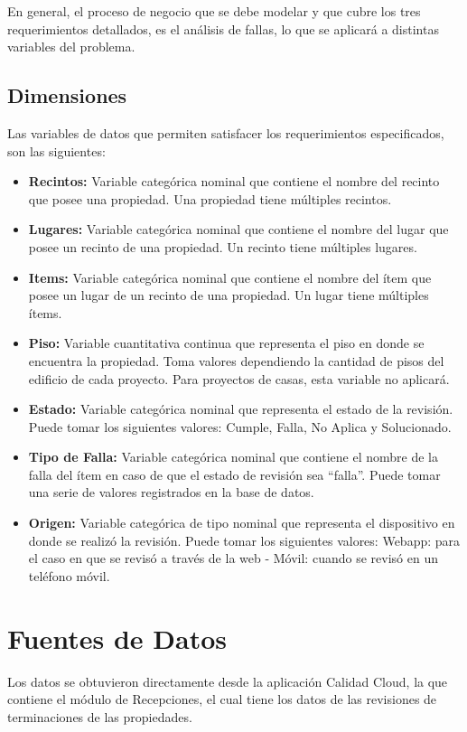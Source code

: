 \documentclass[letter,12pt,oneside]{report}
\begin{document}
En general, el proceso de negocio que se debe modelar y que cubre los tres requerimientos detallados, es el análisis de fallas, lo que se aplicará a distintas variables del problema.

\subsection{Dimensiones}
Las variables de datos que permiten satisfacer los requerimientos especificados, son las siguientes:

\begin{itemize}
\item \textbf{Recintos: }Variable categórica nominal que contiene el nombre del recinto que posee una propiedad. Una propiedad tiene múltiples recintos.
\item \textbf{Lugares: }Variable categórica nominal que contiene el nombre del lugar que posee un recinto de una propiedad. Un recinto tiene múltiples lugares.
\item \textbf{Items: }Variable categórica nominal que contiene el nombre del ítem que posee un lugar de un recinto de una propiedad. Un lugar tiene múltiples ítems.
\item \textbf{Piso: }Variable cuantitativa continua que representa el piso en donde se encuentra la propiedad. Toma valores dependiendo la cantidad de pisos del edificio de cada proyecto. Para proyectos de casas, esta variable no aplicará.
\item \textbf{Estado: }Variable categórica nominal que representa el estado de la revisión. Puede tomar los siguientes valores: Cumple, Falla, No Aplica y Solucionado.
\item \textbf{Tipo de Falla: }Variable categórica nominal que contiene el nombre de la falla del ítem en caso de que el estado de revisión sea “falla”. Puede tomar una serie de valores registrados en la base de datos.
\item \textbf{Origen: }Variable categórica de tipo nominal que representa el dispositivo en donde se realizó la revisión. Puede tomar los siguientes valores: Webapp: para el caso en que se revisó a través de la web - Móvil: cuando se revisó en un teléfono móvil.
\end{itemize}

\section{Fuentes de Datos}
Los datos se obtuvieron directamente desde la aplicación Calidad Cloud, la que contiene el módulo de Recepciones, el cual tiene los datos de las revisiones de terminaciones de las propiedades. 
\end{document}
